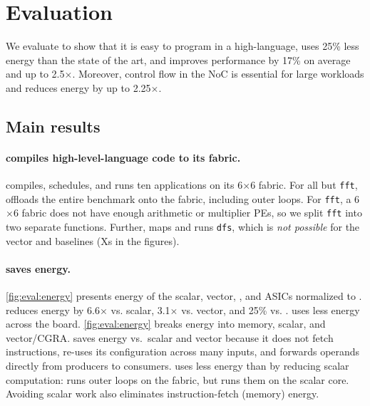 \section{Evaluation}
\label{riptide:eval}

\figRipTidePrimaryArchResults
\figRipTidePrimaryCompilerResults
\figRipTideFINResults
\figRipTideLoCResults

We evaluate \riptide to show that it is easy to program in a high-language,
uses 25\% less energy than the state of the art,
and improves performance by 17\% on average and up to 2.5$\times$.
Moreover, control flow in the NoC is essential for large
workloads and reduces energy by up to 2.25$\times$.

\subsection{Main results}

\paragraph{\riptide compiles high-level-language code to its fabric.} \riptide
compiles, schedules, and runs ten applications on its 6$\times$6 fabric.
% 
For all but {\tt fft}, \riptide offloads the entire benchmark onto the fabric, including
outer loops.
% 
For {\tt fft}, a 6$\times$6 fabric does not have enough arithmetic or multiplier PEs,
so we split {\tt fft} into two separate functions. 
% 
Further, \riptide maps and runs {\tt dfs}, which is {\em not possible} for
the vector and \snafu baselines (Xs in the figures).

\paragraph{\riptide saves energy.}
\autoref{fig:eval:energy} presents energy of the scalar, vector, 
\snafu, and ASICs normalized to \riptide.
% 
\riptide reduces energy by 6.6$\times$ vs. scalar, 3.1$\times$ vs. vector, and 25\% vs. \snafu.
%
\riptide uses less energy across the board.
% 
\autoref{fig:eval:energy} breaks energy into memory, scalar, and vector/CGRA.
% 
\riptide saves energy vs.\ scalar and vector because it does not fetch instructions,
re-uses its configuration across many inputs, and forwards operands 
directly from producers to consumers.
% 
\riptide uses less energy than \snafu by reducing scalar computation:  \riptide runs
outer loops on the fabric, but \snafu runs them on the scalar core.
% 
Avoiding scalar work also eliminates instruction-fetch (memory) energy. 

